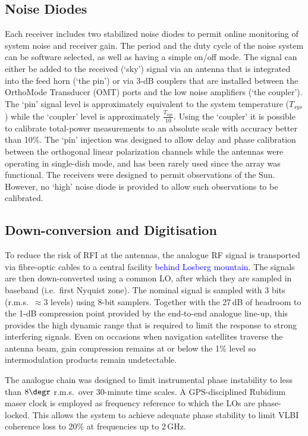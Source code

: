 \subsection{Noise Diodes}


\noindent
Each receiver includes two stabilized noise diodes to permit online
monitoring of system noise and receiver gain. The period and the duty
cycle of the noise system can be software selected, as well as having
a simple on/off mode. The signal can either be added to the received
(`sky') signal via an antenna that is integrated into the feed horn
(`the pin') or via 3-dB couplers that are installed between the
OrthoMode Transducer (OMT) ports and the low noise amplifiers (`the
coupler').  The `pin' signal level is approximately equivalent to the
system temperature (${T_{sys}}$) while the `coupler' level is
approximately $\frac{T_{sys}}{10}$. Using the `coupler' it is possible
to calibrate total-power measurements to an absolute scale with
accuracy better than 10\%.  The `pin' injection was designed to allow
delay and phase calibration between the orthogonal linear polarization
channels while the antennas were operating in single-dish mode, and
has been rarely used since the array was functional.  The receivers
were designed to permit observations of the Sun. However, no `high'
noise diode is provided to allow such observations to be calibrated.


\subsection{Down-conversion and Digitisation}

\noindent
To reduce the risk of RFI at the antennas, the analogue RF signal is
transported via fibre-optic cables to a central facility
\textcolor{blue}{behind Losberg mountain}. The signals are then
down-converted using a common LO, after which they are sampled in
baseband (i.e.~first Nyquist zone). The nominal signal is sampled with
3 bits (r.m.s.~$\approx 3$ levels) using 8-bit samplers. Together with
the 27\,dB of headroom to the 1-dB compression point provided by the
end-to-end analogue line-up, this provides the high dynamic range that
is required to limit the response to strong interfering signals. Even
on occasions when navigation satellites traverse the antenna beam,
gain compression remains at or below the 1\% level so intermodulation
products remain undetectable.

The analogue chain was designed to limit instrumental phase
instability to less than $8\degr$ r.m.s.~over 30-minute time scales. A
GPS-disciplined Rubidium maser clock is employed as frequency
reference to which the LOs are phase-locked. This allows the system to
achieve adequate phase stability to limit VLBI coherence loss to
20\% at frequencies up to 2\,GHz.
